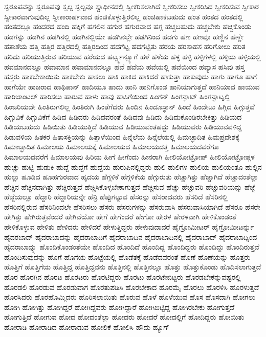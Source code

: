 {ಸ್ವರೂಪವನ್ನು
ಸ್ವರೂಪವು
ಸ್ವಲ್ಪ
ಸ್ವಲ್ಪವೂ
ಸ್ವಾಧೀನದಲ್ಲಿ
ಸ್ವೀಕರಿಸಲಾಗಿದೆ
ಸ್ವೀಕರಿಸಲು
ಸ್ವೀಕರಿಸಿದ
ಸ್ವೀಕರಿಸುವ
ಸ್ವೀಕಾರ
ಸ್ವೀಕಾರವಾಗುವುದಿಲ್ಲ
ಸ್ವೀಕಾರಾರ್ಹವಾದ
ಹಂಚಿಕೊಳ್ಳುತ್ತಿರಲಿಲ್ಲ
ಹಂಚಿಹಾಕಬಹುದು
ಹಂತ
ಹಂತದ
ಹಂತದಲ್ಲಿ
ಹಂತದಲ್ಲೂ
ಹಂದರದ
ಹಂದಿ
ಹಕ್ಕಿಗೆ
ಹಗಲಿನ
ಹಗುರ
ಹಗುರವಾದ
ಹಗ್ಗ
ಹಚ್ಚಬಹುದು
ಹಚ್ಚಬೇಕು
ಹಚ್ಚಿಕೊಂಡು
ಹಡಗನ್ನು
ಹಡಗಿನ
ಹಡಗಿನಲ್ಲಿ
ಹಡಗಿನಲ್ಲಿಯೇ
ಹಡಗಿನಲ್ಲೇ
ಹಡಗಿನಿಂದ
ಹಡಗು
ಹಣ
ಹಣವೂ
ಹಣ್ಣಿನ
ಹಣ್ಣೇ
ಹತಾಶೆಯ
ಹತ್ತಿ
ಹತ್ತಿರ
ಹತ್ತಿರದಲ್ಲಿ
ಹತ್ತಿರದಿಂದ
ಹದಗೆಟ್ಟ
ಹದಗೆಟ್ಟಿತು
ಹರಯ
ಹರಸಾಹಸ
ಹರಿಗೋಲು
ಹರಿತ
ಹರಿದು
ಹರಿಯುತ್ತಿರುವ
ಹರಿಯುವ
ಹರೆಯದ
ಹರ್ಟ್ಸ್ಮನ್ಸ್ಯೂಗೆ
ಹಳೆ
ಹಳೆಯ
ಹಳ್ಳ
ಹಳ್ಳಿ
ಹಳ್ಳಿಗಳಲ್ಲಿ
ಹಳ್ಳಿಯ
ಹಳ್ಳಿಯಲ್ಲಿ
ಹವಮಾನದಲ್ಲೂ
ಹವಾಮಾನ
ಹವಾಮಾನದಲ್ಲೂ
ಹವೆ
ಹವೆಯ
ಹವೆಯಲ್ಲಿ
ಹವೆಯಿಂದ
ಹವ್ಯಾಸ
ಹಸಿವು
ಹಸ್ತ
ಹಸ್ತರು
ಹಾಕಬೇಕಾಯಿತು
ಹಾಕಬೇಕು
ಹಾಕಲು
ಹಾಕಿ
ಹಾಕಿದ
ಹಾಕಿದರೆ
ಹಾಕುತ್ತಾ
ಹಾಕುವುದು
ಹಾಗು
ಹಾಗೂ
ಹಾಗೆ
ಹಾಗೆಯೇ
ಹಾಜರಾದ
ಹಾಥಿಪಾನ್
ಹಾದಿಯೂ
ಹಾದು
ಹಾನಿ
ಹಾನಿಗೊಂಡ
ಹಾನಿಯಾಗುತ್ತದೆ
ಹಾನಿಯಾದ
ಹಾಯುವ
ಹಾರಿಜಾಂಟಲ್
ಹಾರಿಸಲು
ಹಾರುವ
ಹಾಳು
ಹಾವು
ಹಾಸಿಗೆಯಿಂದ
ಹಿಂಗನ್
ಹಿಂಗನ್ಘಾಟ್
ಹಿಂಗನ್ಘಾಟ್ನಲ್ಲಿ
ಹಿಂಜರಿಯದೇ
ಹಿಂತಿರುಗಲಿಲ್ಲ
ಹಿಂತಿರುಗಿ
ಹಿಂತೆಗೆದರು
ಹಿಂದಿನ
ಹಿಂದೂಸ್ಥಾನ್
ಹಿಂದೆ
ಹಿಂದೇಟು
ಹಿಗ್ಗಿದ
ಹಿಗ್ಗುತ್ತವೆ
ಹಿಗ್ಗುವಿಕೆ
ಹಿಗ್ಗುವಿಕೆಗೆ
ಹಿಡಿದ
ಹಿಡಿದರು
ಹಿಡಿದವರಂತೆ
ಹಿಡಿದವು
ಹಿಡಿದು
ಹಿಡಿದುಕೊಂಡಿರಬೇಕಿತ್ತು
ಹಿಡಿಯದ
ಹಿಡಿಯಬಹುದು
ಹಿಡಿಯಿತು
ಹಿಡಿಯುತ್ತಿದೆ
ಹಿಡಿಯುವ
ಹಿಡಿಯುವಂತಹದ್ದು
ಹಿಡಿಯುವರು
ಹಿಡಿಯುವವಳಿದ್ದ
ಹಿಡುವಳಿಯ
ಹಿತಕರ
ಹಿತಾಸಕ್ತಿಯನ್ನು
ಹಿತ್ತಾಳೆಯಿಂದ
ಹಿನ್ನೆಲೆಯ
ಹಿನ್ನೆಲೆಯಲ್ಲಿ
ಹಿಮಚ್ಛಾದಿತ
ಹಿಮಪ್ರದೇಶಕ್ಕೆ
ಹಿಮಾಚ್ಛಾದಿತ
ಹಿಮಾಲಯ
ಹಿಮಾಲಯಕ್ಕೆ
ಹಿಮಾಲಯದ
ಹಿಮಾಲಯದತ್ತ
ಹಿಮಾಲಯದವರೆಗೂ
ಹಿಮಾಲಯದವರೆಗೆ
ಹಿಮಾಲಯವು
ಹಿರಿಯ
ಹೀಗೆ
ಹೀಗೆಂದು
ಹೀನರಾಗಿ
ಹೀಲಿಯೋಟ್ರೋಪ್
ಹೀಲಿಯೋಟ್ರೋಪ್ಗಳ
ಹುಚ್ಚು
ಹುಟ್ಟಿ
ಹುಡುಕಿ
ಹುದ್ದೆ
ಹುದ್ದೆಗೆ
ಹುದ್ದೆಯ
ಹುರುಪಿನಲ್ಲಿದ್ದರು
ಹುಲಿ
ಹುಲಿಗಳ
ಹುಲಿಯ
ಹುಲಿಯಂತೂ
ಹುಲ್ಲಿನ
ಹುಲ್ಲು
ಹೂಡಿದ
ಹೂಹಗುರವಾದ
ಹೃದಯ
ಹೆಗ್ಗಳಿಕೆ
ಹೆಗ್ಗಳಿಕೆಯ
ಹೆಗ್ಗುರುತು
ಹೆಚ್ಚಾಗಿತ್ತು
ಹೆಚ್ಚಾಗಿದೆ
ಹೆಚ್ಚಾದಂತೆಲ್ಲಾ
ಹೆಚ್ಚಿನ
ಹೆಚ್ಚಿನದಾಗಿತ್ತು
ಹೆಚ್ಚಿರುತ್ತದೆ
ಹೆಚ್ಚಿಸಿಕೊಳ್ಳಬೇಕಾಗುತ್ತದೆ
ಹೆಚ್ಚಿಸುವ
ಹೆಚ್ಚು
ಹೆಚ್ಚುವರಿ
ಹೆಚ್ಚುವರಿಯನ್ನು
ಹೆಜ್ಜೆ
ಹೆಜ್ಜೆಯಲ್ಲೂ
ಹೆದ್ದಾರಿ
ಹೆದ್ದಾರಿಯನ್ನೇ
ಹೆನ್ರಿ
ಹೆಪ್ಪುಗಟ್ಟುವ
ಹೆಸರನ್ನು
ಹೆಸರಾದವರು
ಹೆಸರಿದೆ
ಹೆಸರಿನಲ್ಲಿ
ಹೆಸರಿನಲ್ಲಿರುವ
ಹೆಸರಿನಿಂದಲೇ
ಹೆಸರಿಸಲು
ಹೆಸರು
ಹೆಸರುಗಳನ್ನು
ಹೆಸರುವಾಸಿ
ಹೆಸರುವಾಸಿಯಾಗಿದೆ
ಹೆಸರೂ
ಹೆಸರೇ
ಹೇಗಿತ್ತು
ಹೇಗಿರುತ್ತವೆಂದರೆ
ಹೇಗಿವೆಯೋ
ಹೇಗೆ
ಹೇಗೆಂದರೆ
ಹೇಗೋ
ಹೇರಳ
ಹೇರಳವಾಗಿ
ಹೇಳಿಕೊಂಡಂತೆ
ಹೇಳಿಕೊಳ್ಳುವ
ಹೇಳಿತು
ಹೇಳಿದರು
ಹೇಳಿದರೆ
ಹೇಳುತ್ತಿದ್ದರು
ಹೇಳುವುದಾದರೆ
ಹೈಗ್ರೋಮೀಟರ್
ಹೈಗ್ರೋಮೀಟರ್ನ್ನು
ಹೈದರಬಾದ್
ಹೈದರಾಬಾದನ್ನು
ಹೈದರಾಬಾದಿಗೆ
ಹೈದರಾಬಾದಿನ
ಹೈದರಾಬಾದಿನಲ್ಲಿ
ಹೈದರಾಬಾದ್
ಹೈದರಾಬಾದ್ನಿಂದ
ಹೈದರಾಬಾದ್ನ್ನು
ಹೊಂದಿಕೊಂಡಂತೆಯೇ
ಹೊಂದಿದ
ಹೊಂದಿದೆ
ಹೊಂದಿದ್ದ
ಹೊಂದಿದ್ದರು
ಹೊಂದಿದ್ದು
ಹೊಂದಿರುತ್ತವೆ
ಹೊಂದಿಸುವುದನ್ನು
ಹೊಗೆ
ಹೊಗೆಯ
ಹೊಟ್ಟೆಯಲ್ಲಿ
ಹೊಡೆತಕ್ಕೆ
ಹೊಡೆದವರಂತೆ
ಹೊಣೆ
ಹೊಣೆಯನ್ನು
ಹೊತ್ತರು
ಹೊತ್ತಿಗೆ
ಹೊತ್ತಿಗೆಯ
ಹೊತ್ತಿದ್ದ
ಹೊತ್ತಿದ್ದವನು
ಹೊತ್ತಿನಲ್ಲಿ
ಹೊತ್ತಿನಲ್ಲೂ
ಹೊತ್ತು
ಹೊತ್ತುಕೊಂಡು
ಹೊದಿಸಲಾಗುತ್ತದೆ
ಹೊರ
ಹೊರಗಿನ
ಹೊರಟ
ಹೊರಟರು
ಹೊರಟಿದ್ದರು
ಹೊರಟು
ಹೊರಟೇಬಿಟ್ಟರು
ಹೊರಡಬೇಕೆನ್ನುವಷ್ಟರಲ್ಲಿ
ಹೊರಡಲಿ
ಹೊರಡುವ
ಹೊರಡುವಾಗ
ಹೊರತುಪಡಿಸಿ
ಹೊರಬೇಕಾದ
ಹೊರಮೈ
ಹೊರಲು
ಹೊರಳಿಸಿ
ಹೊರಳುತ್ತದೆ
ಹೊರಸಿದರು
ಹೊರಹೊಮ್ಮಿದರು
ಹೊರಿಸಲಾಯಿತು
ಹೊರುವ
ಹೊಳೆ
ಹೊಳೆಯುವ
ಹೊಸ
ಹೊಸದಾಗಿ
ಹೋಗಲು
ಹೋಗಿ
ಹೋಗಿತ್ತು
ಹೋಗಿದ್ದರೆ
ಹೋಗಿದ್ದವರು
ಹೋಗಿದ್ದಾರೆ
ಹೋಗಿಬಿಟ್ಟಿದ್ದ
ಹೋಗಿರಬೇಕು
ಹೋಗುತ್ತದೆ
ಹೋಗುತ್ತಿದೆ
ಹೋಗುವ
ಹೋದ
ಹೋದಂತೆಲ್ಲಾ
ಹೋದರು
ಹೋದರೆ
ಹೋದಲ್ಲಿಗೆ
ಹೋದಿದ್ದರು
ಹೋಯಿತು
ಹೋರಾಡಿ
ಹೋರಾಡಿದ
ಹೋರಾಡುವ
ಹೋಲಿಕೆ
ಹೋಲಿಸಿ
ಹೌದು
ಹ್ಯೂಗ್
}
